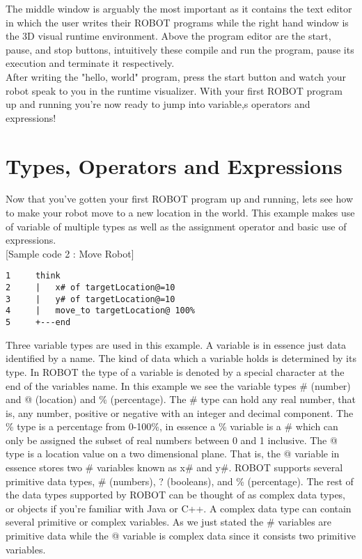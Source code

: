\documentclass[a4paper]{article}
\begin{document}
The middle window is arguably the most important as it contains the text editor in which the user writes their ROBOT programs while the right hand window is the 3D visual runtime environment. Above the program editor are the start, pause, and stop buttons, intuitively these compile and run the program, pause its execution and terminate it respectively.\\

After writing the "hello, world" program, press the start button and watch your robot speak to you in the runtime visualizer. With your first ROBOT program up and running you're now ready to jump into variable,s operators and expressions!\\

\pagebreak

\section{Types, Operators and Expressions}

Now that you've gotten your first ROBOT program up and running, lets see how to make your robot move to a new location in the world. This example makes use of variable of multiple types as well as the assignment operator and basic use of expressions.\\

[Sample code 2 : Move Robot]
\begin{verbatim}
1     think
2     |   x# of targetLocation@=10
3     |   y# of targetLocation@=10
4     |   move_to targetLocation@ 100%       
5     +---end
\end{verbatim}


Three variable types are used in this example. A variable is in essence just data identified by a name. The kind of data which a variable holds is determined by its type. In ROBOT the type of a variable is denoted by a special character at the end of the variables name. In this example we see the variable types \# (number) and @ (location) and \% (percentage). The \# type can hold any real number, that is, any number, positive or negative with an integer and decimal component. The \% type is a percentage from 0-100\%, in essence a \% variable is a \# which can only be assigned the subset of real numbers between 0 and 1 inclusive. The @ type is a location value on a two dimensional plane. That is, the @ variable in essence stores two \# variables known as x\# and y\#. ROBOT supports several primitive data types, \# (numbers), ? (booleans), and \% (percentage). The rest of the data types supported by ROBOT can be thought of as complex data types, or objects if you're familiar with Java or C++. A complex data type can contain several primitive or complex variables. As we just stated the \# variables are primitive data while the @ variable is complex data since it consists two primitive variables.\\
\end{document}
